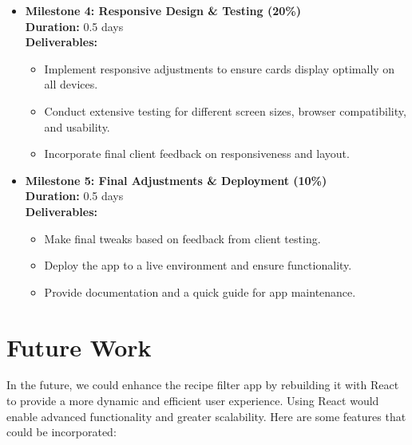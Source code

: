 \documentclass{article}
\begin{document}
\begin{itemize}
    \item \textbf{Milestone 4: Responsive Design \& Testing (20\%)} \\
    \textbf{Duration:} 0.5 days \\
    \textbf{Deliverables:}
    \begin{itemize}
        \item Implement responsive adjustments to ensure cards display optimally on all devices.
        \item Conduct extensive testing for different screen sizes, browser compatibility, and usability.
        \item Incorporate final client feedback on responsiveness and layout.
    \end{itemize}

    \item \textbf{Milestone 5: Final Adjustments \& Deployment (10\%)} \\
    \textbf{Duration:} 0.5 days \\
    \textbf{Deliverables:}
    \begin{itemize}
        \item Make final tweaks based on feedback from client testing.
        \item Deploy the app to a live environment and ensure functionality.
        \item Provide documentation and a quick guide for app maintenance.
    \end{itemize}
\end{itemize}

\section*{Future Work}

In the future, we could enhance the recipe filter app by rebuilding it with React to provide a more dynamic and efficient user experience. Using React would enable advanced functionality and greater scalability. Here are some features that could be incorporated:
\end{document}
